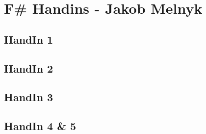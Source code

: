 \section{F\# Handins - Jakob Melnyk}
\label{Appendix_FSharp_Melnyk}

\subsection{HandIn 1}
\label{Appendix_FSharp_Melnyk_1}
\subsection{HandIn 2}
\label{Appendix_FSharp_Melnyk_2}
\subsection{HandIn 3}
\label{Appendix_FSharp_Melnyk_3}
\subsection{HandIn 4 \& 5}
\label{Appendix_FSharp_Melnyk_4and5}